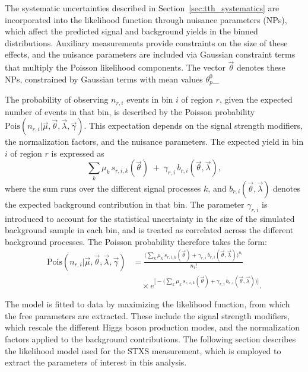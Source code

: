   The systematic uncertainties described in Section~\ref{sec:tth_systematics} are incorporated into the likelihood function through nuisance parameters (NPs), 
  which affect the predicted signal and background yields in the binned distributions. 
  Auxiliary measurements provide constraints on the size of these effects, and the nuisance parameters are included via Gaussian constraint terms that multiply the Poisson likelihood components. 
  The vector $\vec{\theta}$ denotes these NPs, constrained by Gaussian terms with mean values $\theta^{0}_{p}$_
  
  The probability of observing $n_{r,i}$ events in bin $i$ of region $r$, 
  given the expected number of events in that bin, is described by the Poisson probability 
  $\text{Pois}(n_{r,i}|\vec{\mu},\vec{\theta},\vec{\lambda},\vec{\gamma})$. 
  This expectation depends on the signal strength modifiers, the normalization factors, and the nuisance parameters. 
  The expected yield in bin $i$ of region $r$ is expressed as
  \begin{equation}
  \sum_{k} \mu_k \, s_{r,i,k}(\vec{\theta}) \;+\; \gamma_{r,i} \, b_{r,i}(\vec{\theta},\vec{\lambda}),
  \end{equation}
  where the sum runs over the different signal processes $k$, 
  and $b_{r,i}(\vec{\theta},\vec{\lambda})$ denotes the expected background contribution in that bin. 
  The parameter $\gamma_{r,i}$ is introduced to account for the statistical uncertainty in the size of the simulated background sample in each bin, 
  and is treated as correlated across the different background processes. 
The Poisson probability therefore takes the form:
\begin{equation}
  \begin{aligned}
  \text{Pois}(n_{r,i}|\vec{\mu},\vec{\theta},\vec{\lambda},\vec{\gamma}) 
  &= \frac{\Big(\sum_{k} \mu_k \, s_{r,i,k}(\vec{\theta}) + \gamma_{r,i} \, b_{r,i}(\vec{\theta},\vec{\lambda}) \Big)^{n_i}}{n_i!} \\
  &\quad \times 
  e^{\!\Big[-\Big(\sum_{k} \mu_k \, s_{r,i,k}(\vec{\theta}) + \gamma_{r,i} \, b_{r,i}(\vec{\theta},\vec{\lambda}) \Big)\Big]}.
  \end{aligned}
  \end{equation}
  

  The model is fitted to data by maximizing the likelihood function, 
  from which the free parameters are extracted. 
  These include the signal strength modifiers, which rescale the different Higgs boson production modes, 
  and the normalization factors applied to the background contributions. 
  The following section describes the likelihood model used for the STXS measurement, 
  which is employed to extract the parameters of interest in this analysis.
  
